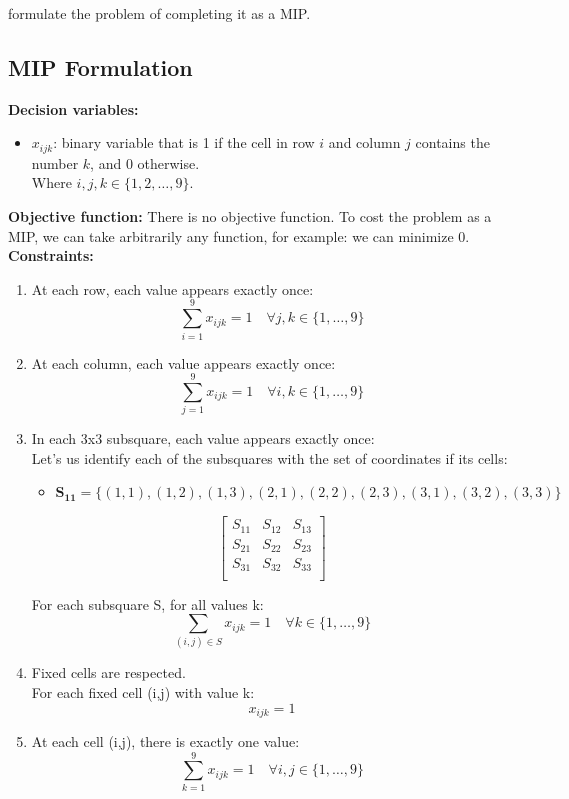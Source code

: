 \documentclass[a4paper,10pt]{article}
\begin{document}
formulate the problem of completing it as a MIP.
\subsection*{MIP Formulation}

\textbf{Decision variables:}
\begin{itemize}
  \item \(x_{ijk}\): binary variable that is 1 if the cell in row \(i\) and column \(j\) contains the number \(k\), and 0 otherwise.\\
  Where \(i, j, k \in \{1, 2, \ldots, 9\}\).
\end{itemize}

\textbf{Objective function:}
There is no objective function. To cost the problem as a MIP, we can take arbitrarily any function, for example: we can minimize 0.\\

\textbf{Constraints:}
\begin{enumerate}
  \item At each row, each value appears exactly once:
  \[
  \sum_{i=1}^{9} x_{ijk} = 1 \quad \forall j, k \in \{1, \ldots, 9\}
  \]
  \item At each column, each value appears exactly once:
  \[
  \sum_{j=1}^{9} x_{ijk} = 1 \quad \forall i, k \in \{1, \ldots, 9\}
  \]
  \item In each 3x3 subsquare, each value appears exactly once:\\

  Let's us identify each of the subsquares with the set of coordinates if its cells:
  \begin{itemize}
    \item $\mathbf{S_{11}} = \{(1,1), (1,2), (1,3), (2,1), (2,2), (2,3), (3,1), (3,2), (3,3)\}$ 
  \end{itemize}

  \[
    \begin{bmatrix}
      S_{11} & S_{12} & S_{13} \\
      S_{21} & S_{22} & S_{23} \\
      S_{31} & S_{32} & S_{33} \\
    \end{bmatrix}
  \]

  For each subsquare S, for all values k:
  \[\sum_{(i,j) \in S} x_{ijk} = 1 \quad \forall k \in \{1, \ldots, 9\}\]

  \item Fixed cells are respected. \\
  For each fixed cell (i,j) with value k:
  \[x_{ijk} = 1\]

  \item At each cell (i,j), there is exactly one value:
  \[\sum_{k=1}^{9} x_{ijk} = 1 \quad \forall i, j \in \{1, \ldots, 9\}\]

\end{enumerate}
\end{document}
